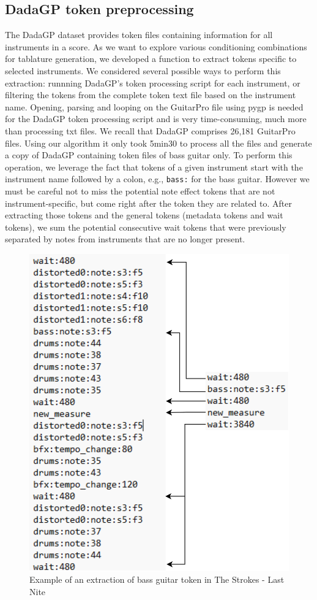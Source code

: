 \subsection{DadaGP token preprocessing}

The DadaGP dataset provides token files containing information for all instruments in a score.
As we want to explore various conditioning combinations for tablature generation, we developed a function to extract tokens specific to selected instruments.
We considered several possible ways to perform this extraction: runnning DadaGP's token processing script for each instrument, or filtering the tokens from the complete token text file based on the instrument name.
Opening, parsing and looping on the GuitarPro file using pygp is needed for the DadaGP token processing script and is very time-consuming, much more than processing txt files.
We recall that DadaGP comprises 26,181 GuitarPro files.
Using our algorithm it only took 5min30 to process all the files and generate a copy of DadaGP containing token files of bass guitar only.
To perform this operation, we leverage the fact that tokens of a given instrument start with the instrument name followed by a colon, e.g., \texttt{bass:} for the bass guitar.
However we must be careful not to miss the potential note effect tokens that are not instrument-specific, but come right after the token they are related to.
After extracting those tokens and the general tokens (metadata tokens and wait tokens),
we sum the potential consecutive wait tokens that were previously separated by notes from instruments that are no longer present.

\begin{figure}[!ht]
    \centering
    \includegraphics[width=.5\linewidth]{../images-figures/token_extraction.png}
    \caption{Example of an extraction of bass guitar token in The Strokes - Last Nite}
    \label{fig:token_extraction}
\end{figure}

